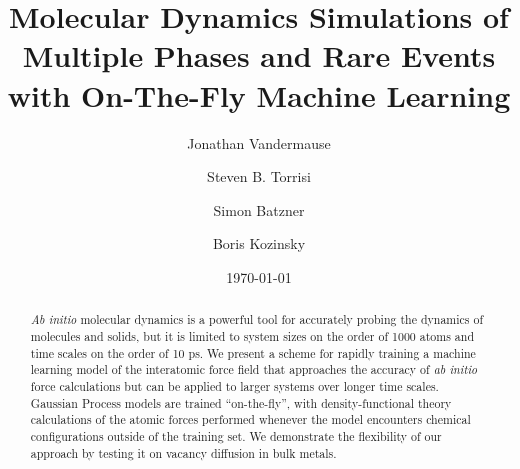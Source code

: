 \documentclass[%
superscriptaddress,
preprint,
amsmath,amssymb,
aps,
prl,
]{revtex4-1}
\begin{document}
\title{Molecular Dynamics Simulations of Multiple Phases and Rare Events with On-The-Fly Machine Learning}

\author{Jonathan Vandermause}

\author{Steven B. Torrisi}

\author{Simon Batzner}

\author{Boris Kozinsky}



\date{\today}

\begin{abstract}
\textit{Ab initio} molecular dynamics is a powerful tool for
accurately probing the dynamics of molecules and solids, but it is limited
to system sizes on the order of 1000 atoms and time scales on the order of
10 ps. We present a scheme for rapidly training a machine learning 
model of the interatomic force field that approaches the accuracy of \textit{ab initio} force calculations but can be applied to larger systems over longer time scales. Gaussian Process models are trained “on-the-fly”, with density-functional theory calculations of the atomic forces performed whenever the model encounters chemical configurations outside of the training set. We demonstrate the flexibility of our approach by testing it on vacancy diffusion in bulk metals.
\end{abstract}
\end{document}
